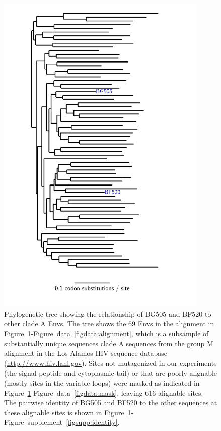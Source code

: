 \documentclass[9pt]{elife}
\begin{document}
\begin{figure}
\centerline{\includegraphics[clip=true, trim= 0in 0in 1in 0in, angle=-90, width=0.9\textwidth]{figures/tree_plot.pdf}}
\caption{\label{fig:tree}
Phylogenetic tree showing the relationship of BG505 and BF520 to other clade A Envs.
The tree shows the 69 Envs in the alignment in Figure~\ref{fig:tree}-Figure~data~\ref{figdata:alignment}, which is a subsample of substantially unique sequences clade A sequences from the group M alignment in the Los Alamos HIV sequence database (\url{http://www.hiv.lanl.gov}).
Sites not mutagenized in our experiments (the signal peptide and cytoplasmic tail) or that are poorly alignable (mostly sites in the variable loops) were masked as indicated in Figure~\ref{fig:tree}-Figure~data~\ref{figdata:mask}, leaving 616 alignable sites.
The pairwise identity of BG505 and BF520 to the other sequences at these alignable sites is shown in Figure~\ref{fig:tree}-Figure~supplement~\ref{figsupp:identity}.
}
\end{figure}
\end{document}
